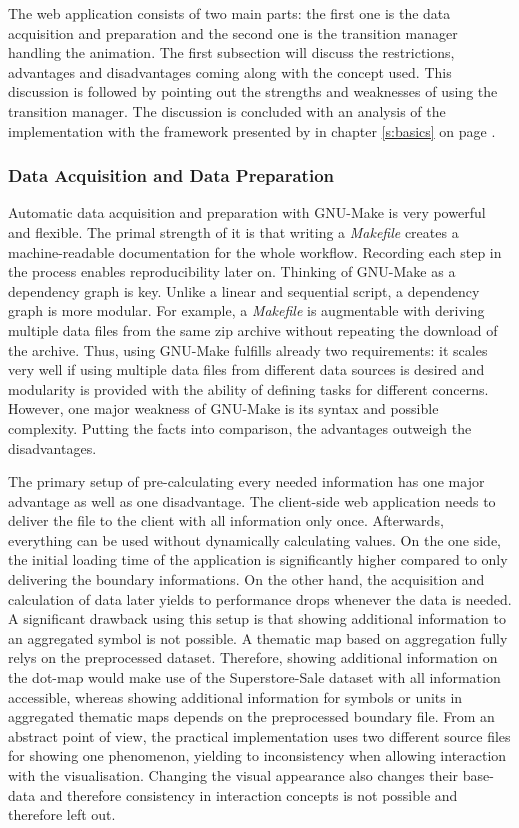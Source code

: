 The web application consists of two main parts: the first one is the data acquisition and preparation and the second one is the transition manager handling the animation. The first subsection will discuss the restrictions, advantages and disadvantages coming along with the concept used. This discussion is followed by pointing out the strengths and weaknesses of using the transition manager. The discussion is concluded with an analysis of the implementation with the framework presented by \citeauthor{Munzner2014} in chapter \ref{s:basics} on page \pageref{s:basics}.

\subsubsection{Data Acquisition and Data Preparation}
Automatic data acquisition and preparation with GNU-Make is very powerful and flexible. The primal strength of it is that writing a \textit{Makefile} creates a machine-readable documentation for the whole workflow. Recording each step in the process enables reproducibility later on.
Thinking of GNU-Make as a dependency graph is key. Unlike a linear and sequential script, a dependency graph is more modular. For example, a \textit{Makefile} is augmentable with deriving multiple data files from the same zip archive without repeating the download of the archive. Thus, using GNU-Make fulfills already two requirements: it scales very well if using multiple data files from different data sources is desired and modularity is provided with the ability of defining tasks for different concerns. However, one major weakness of GNU-Make is its syntax and possible complexity. Putting the facts into comparison, the advantages outweigh the disadvantages.

The primary setup of pre-calculating every needed information has one major advantage as well as one disadvantage. The client-side web application needs to deliver the file to the client with all information only once. Afterwards, everything can be used without dynamically calculating values. On the one side, the initial loading time of the application is significantly higher compared to only delivering the boundary informations. On the other hand, the acquisition and calculation of data later yields to performance drops whenever the data is needed.
A significant drawback using this setup is that showing additional information to an aggregated symbol is not possible. A thematic map based on aggregation fully relys on the preprocessed dataset. Therefore, showing additional information on the dot-map would make use of the Superstore-Sale dataset with all information accessible, whereas showing additional information for symbols or units in aggregated thematic maps depends on the preprocessed boundary file. From an abstract point of view, the practical implementation uses two different source files for showing one phenomenon, yielding to inconsistency when allowing interaction with the visualisation. Changing the visual appearance also changes their base-data and therefore consistency in interaction concepts is not possible and therefore left out.

